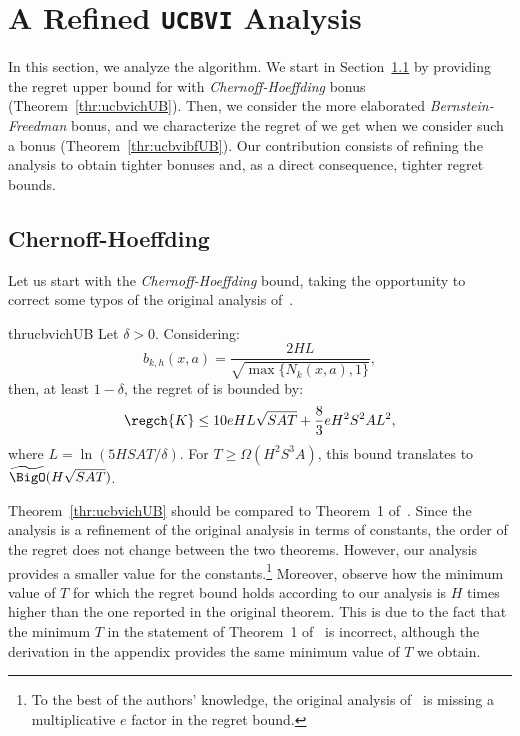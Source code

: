 \section{A Refined \texttt{UCBVI} Analysis}
\label{sec:analysis}

In this section, we analyze the \ucbvi algorithm. We start in Section~\ref{sec:analysis:ch} by providing the regret upper bound for \ucbvi with \emph{Chernoff-Hoeffding} bonus (Theorem~\ref{thr:ucbvichUB}). Then, we consider the more elaborated \emph{Bernstein-Freedman} bonus, and we characterize the regret of \ucbvi we get when we consider such a bonus (Theorem~\ref{thr:ucbvibfUB}). Our contribution consists of refining the analysis to obtain tighter bonuses and, as a direct consequence, tighter regret bounds.

\subsection{Chernoff-Hoeffding}
\label{sec:analysis:ch}

Let us start with the \emph{Chernoff-Hoeffding} bound, taking the opportunity to correct some typos of the original analysis of~\citep{azar2017minimax}.
\addtocounter{footnote}{1}

\begin{restatable}{thr}{ucbvichUB}\label{thr:ucbvichUB}
Let $\delta > 0$. Considering:\footnotemark[2]
\begin{equation*}
    b_{k,h}(x,a) = \frac{2HL}{\sqrt{\max \{ N_{k}(x,a), 1 \}}}, 
\end{equation*}
then, \wp at least $1-\delta$, the regret of \ucbvich is bounded by:
\begin{equation*}
    \regch{K} \le 10 e HL \sqrt{SAT} + \frac{8}{3} e H^2 S^2 A L^2,
\end{equation*}
where $L = \ln{(5HSAT / \delta)}$. For $T \ge \Omega ( H^2 S^3 A )$, this bound translates to $\widetilde{\BigO}(H \sqrt{SAT})$.
\end{restatable}%
Theorem~\ref{thr:ucbvichUB} should be compared to Theorem~1 of~\citep{azar2017minimax}. Since the analysis is a refinement of the original analysis in terms of constants, the order of the regret does not change between the two theorems. However, our analysis provides a smaller value for the constants.\footnote{To the best of the authors' knowledge, the original analysis of~\citep{azar2017minimax} is missing a multiplicative $e$ factor in the regret bound.} Moreover, observe how the minimum value of $T$ for which the regret bound holds according to our analysis is $H$ times higher than the one reported in the original theorem. This is due to the fact that the minimum $T$ in the statement of Theorem~1 of~\citep{azar2017minimax} is incorrect, although the derivation in the appendix provides the same minimum value of $T$ we obtain.

